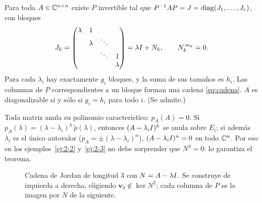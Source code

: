 \documentclass[11pt,twoside]{article}
\newcommand\vv{\bm{v}}
\newcommand\mat[1]{\begin{pmatrix}#1\end{pmatrix}}
\newcommand\smat[1]{\left(\begin{smallmatrix}#1\end{smallmatrix}\right)}
\begin{document}
\begin{teorema}\label{teo:jordan}
Para toda $A\in\mathbb{C}^{n\times n}$ existe $P$ invertible tal que $P^{-1}AP=J=\operatorname{diag}(J_1,\dots,J_r)$, con bloques
\begin{equation}\label{eq:bloque}
J_k=\mat{\lambda&1&&\\&\lambda&\ddots&\\&&\ddots&1\\&&&\lambda}=\lambda\Id+N_k,\qquad N_k^{\,m_k}=0 .
\end{equation}
Para cada $\lambda_i$ hay exactamente $g_i$ bloques, y la suma de sus tamaños es $h_i$. Las columnas de $P$
correspondientes a un bloque forman una cadena \eqref{eq:cadena}. $A$ es diagonalizable si y sólo si $g_i=h_i$ para
todo $i$. (Se admite.)
\end{teorema}

\begin{recordatorio}
Toda matriz anula su polinomio característico: $p_A(A)=0$. Si $p_A(\lambda)=(\lambda-\lambda_i)^{h}\,\tilde p(\lambda)$,
entonces $(A-\lambda_iI)^{h}$ se anula sobre $E_i$; si además $\lambda_i$ es el único autovalor
($p_A=\pm(\lambda-\lambda_i)^n$), $(A-\lambda_iI)^n=0$ en todo $\mathbb{C}^n$. Por eso en los ejemplos~\ref{ej:2-2}
y~\ref{ej:2-3} no debe sorprender que $N^3=0$: lo garantiza el teorema.
\end{recordatorio}

\begin{figure}[!htbp]
\centering
{}
\caption{Cadena de Jordan de longitud 3 con $N=A-\lambda I$. Se construye de izquierda a derecha, eligiendo
$\vv_3\notin\ker N^2$; cada columna de $P$ es la imagen por $N$ de la siguiente.}
\label{fig:cadena}
\end{figure}
\end{document}
